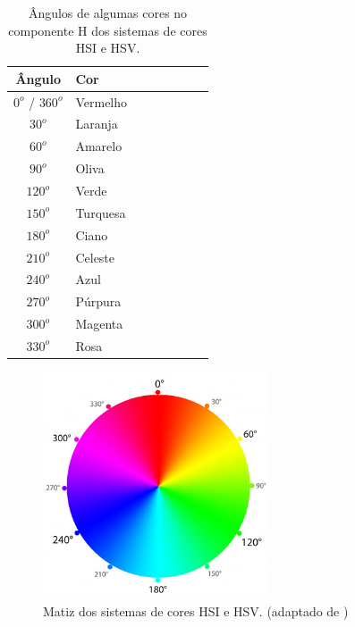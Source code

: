 \documentclass[	12pt, Times, openright, twoside, a4paper, english, brazil]{abntex2}
\begin{document}
\begin{table}[ht]
\centering
\begin{tabular}{clcccccc}
\hline      

\textbf{Ângulo}     & \textbf{Cor}  \\ \hline
$0^o$ / $360^o$     & Vermelho      \\ \hline
$30^o$              & Laranja       \\ \hline
$60^o$              & Amarelo       \\ \hline
$90^o$              & Oliva         \\ \hline
$120^o$             & Verde         \\ \hline
$150^o$             & Turquesa      \\ \hline
$180^o$             & Ciano         \\ \hline
$210^o$             & Celeste       \\ \hline
$240^o$             & Azul          \\ \hline
$270^o$             & Púrpura       \\ \hline
$300^o$             & Magenta       \\ \hline
$330^o$             & Rosa          \\ \hline

\end{tabular}
\caption{Ângulos de algumas cores no componente H dos sistemas de cores HSI e HSV.}
\label{tab:coresEmH}
\end{table}

\begin{figure}[!htb]
\centering \includegraphics[width=0.60\textwidth]{figuraColorsH.PNG}
\caption{Matiz dos sistemas de cores HSI e HSV. (adaptado de ) \label{fig:figuraColorsH}}
\end{figure}
\end{document}
